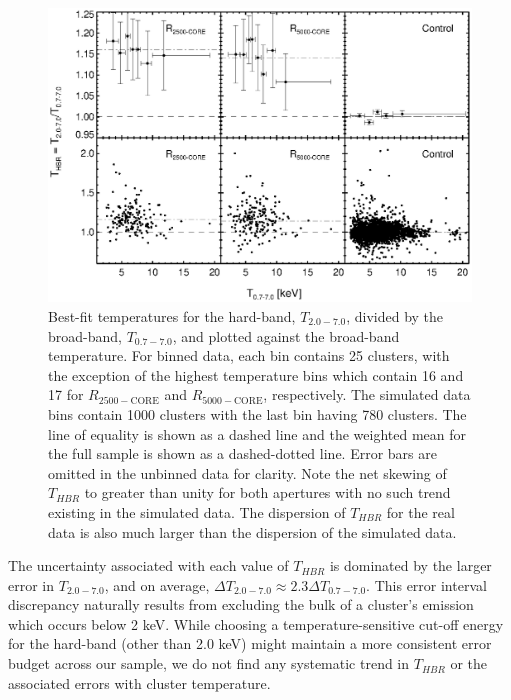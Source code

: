 \documentclass[12pt,preprint]{aastex}
\begin{document}
\clearpage
\begin{figure}
\begin{center}
\includegraphics*[width=\textwidth, trim=0mm 0mm 0mm 0mm, clip]{f3.eps}
\caption{
Best-fit temperatures for the hard-band, $T_{2.0-7.0}$, divided by the
broad-band, $T_{0.7-7.0}$, and plotted against the broad-band
temperature. For binned data, each bin contains 25 clusters, with the
exception of the highest temperature bins which contain 16 and 17 for
$R_{2500-\mathrm{CORE}}$ and $R_{5000-\mathrm{CORE}}$, respectively. The
simulated data bins contain 1000 clusters with the last bin having 780
clusters. The line of equality is shown as a dashed line and the
weighted mean for the full sample is shown as a dashed-dotted
line. Error bars are omitted in the unbinned data for clarity. Note
the net skewing of $T_{HBR}$ to greater than unity for both apertures
with no such trend existing in the simulated data. The dispersion of
$T_{HBR}$ for the real data is also much larger than the dispersion of
the simulated data.
}
\label{fig:ftx}
\end{center}
\end{figure}
\clearpage

The uncertainty associated with each value of $T_{HBR}$ is dominated by
the larger error in $T_{2.0-7.0}$, and on average, $\Delta T_{2.0-7.0} \approx
2.3\Delta T_{0.7-7.0}$. This error interval discrepancy naturally results
from excluding the bulk of a cluster's emission which occurs below 2
keV. While choosing a temperature-sensitive cut-off energy for the
hard-band (other than 2.0 keV) might maintain a more consistent
error budget across our sample, we do not find any systematic trend in
$T_{HBR}$ or the associated errors with cluster temperature.
\end{document}
